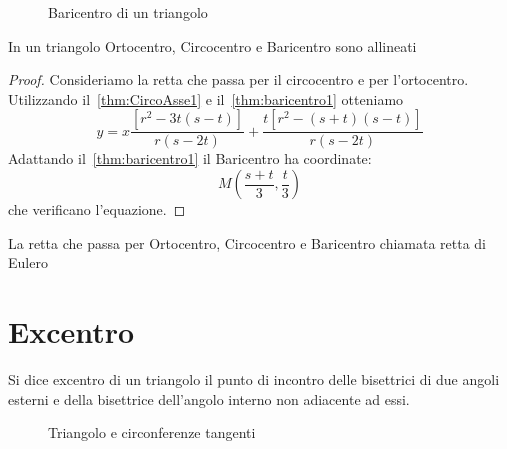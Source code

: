 \begin{figure}
	\centering
	
	\caption{Baricentro di un triangolo}
	\label{fig:baricentro1}
\end{figure}
\begin{thm}\label{thm:eulero1}
In un triangolo Ortocentro, Circocentro e Baricentro sono allineati
\end{thm}
\begin{proof}
	Consideriamo la retta che passa per il circocentro e per l'ortocentro. Utilizzando il~\cref{thm:CircoAsse1} e il~\cref{thm:baricentro1} otteniamo
	\[y=x\dfrac{[r^2-3t(s-t)]}{r(s-2t)}+\dfrac{t[r^2-(s+t)(s-t)]}{r(s-2t)}\]
Adattando il~\cref{thm:baricentro1} il Baricentro ha coordinate: \[M\left(\frac{s+t}{3},\frac{t}{3}\right)\] che verificano l'equazione.
\end{proof}
\begin{defn}\label{defn:rettaEulero1}
La retta che passa per Ortocentro, Circocentro e Baricentro  chiamata retta di Eulero\end{defn}
\section{Excentro}\label{sec:excentro}
\begin{defn}[Exentro]\label{defn:excentro}
Si dice excentro  di un triangolo il punto di incontro delle bisettrici di due angoli esterni e della bisettrice dell'angolo interno non adiacente ad essi.
\end{defn}
\begin{figure}
	\centering
	
	\caption{Triangolo e circonferenze tangenti}
	\label{fig:excentro1}
\end{figure}
